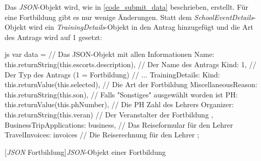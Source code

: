 Das \textit{JSON}-Objekt wird, wie in \autoref{code_submit_data} beschrieben, erstellt. Für eine Fortbildung gibt es nur wenige Änderungen.
Statt dem \textit{SchoolEventDetails}-Objekt wird ein \textit{TrainingDetails}-Objekt in den Antrag hinzugefügt und die Art des Antrags wird auf 1 gesetzt:
\begin{code}{js}
var data = {		// Das JSON-Objekt mit allen Informationen
	Name: this.returnString(this.escorts.description),	// Der Name des Antrags
	Kind: 1,	// Der Typ des Antrags (1 = Fortbildung)
	// ...
	TrainingDetails: {
		Kind: this.returnValue(this.selected),	// Die Art der Fortbildung
		MiscellaneousReason: this.returnString(this.son),	// Falls "Sonstiges" ausgewählt worden ist
		PH: this.returnValue(this.phNumber),	// Die PH Zahl des Lehrers
		Organizer: this.returnString(this.veran)	// Der Veranstalter der Fortbildung
	},
	BusinessTripApplications: business,	// Das Reiseformular für den Lehrer
	TravelInvoices: invoices	// Die Reiserechnung für den Lehrer
};
\end{code}
[\textit{JSON} Fortbildung]{\textit{JSON}-Objekt einer Fortbildung}~\\
\newpage
